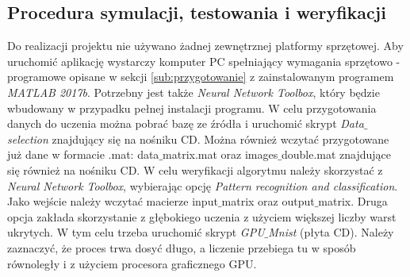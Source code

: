 \subsection{Procedura symulacji, testowania i weryfikacji}
\label{sub:procedura}

Do realizacji projektu nie używano żadnej zewnętrznej platformy sprzętowej. Aby uruchomić aplikację wystarczy komputer PC spełniający wymagania sprzętowo - programowe opisane w sekcji \ref{sub:przygotowanie} z zainstalowanym programem \textit{MATLAB 2017b}. Potrzebny jest także \textit{Neural Network Toolbox}, który będzie wbudowany w przypadku pełnej instalacji programu. W celu przygotowania danych do uczenia można pobrać bazę ze źródła \cite{baza} i uruchomić skrypt \textit{Data$\_$selection} znajdujący się na nośniku CD. Można również wczytać przygotowane już dane w formacie .mat: data$\_$matrix.mat oraz images$\_$double.mat znajdujące się również na nośniku CD. W celu weryfikacji algorytmu należy skorzystać z \textit{Neural Network Toolbox}, wybierając opcję \textit{Pattern recognition and classification}. Jako wejście należy wczytać macierze input$\_$matrix oraz output$\_$matrix. Druga opcja zakłada skorzystanie z głębokiego uczenia z użyciem większej liczby warst ukrytych. W tym celu trzeba uruchomić skrypt \textit{GPU$\_$Mnist} (płyta CD). Należy zaznaczyć, że proces trwa dosyć długo, a liczenie przebiega tu w sposób równoległy i z użyciem procesora graficznego GPU.

